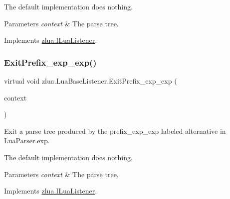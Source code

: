 The default implementation does nothing.


\begin{DoxyParams}{Parameters}
{\em context} & The parse tree.\\
\hline
\end{DoxyParams}


Implements \mbox{\hyperlink{interfacezlua_1_1_i_lua_listener_a067b1e085ec7ffaab84c99f820ccd5fa}{zlua.\+I\+Lua\+Listener}}.

\mbox{\label{classzlua_1_1_lua_base_listener_a7127f827c3355d3bac100faa365ffa5b}} 
\subsubsection{\texorpdfstring{Exit\+Prefix\+\_\+exp\+\_\+exp()}{ExitPrefix\_exp\_exp()}}
{\footnotesize\ttfamily virtual void zlua.\+Lua\+Base\+Listener.\+Exit\+Prefix\+\_\+exp\+\_\+exp (\begin{DoxyParamCaption}\item[{\mbox{[}\+Not\+Null\mbox{]} \mbox{\hyperlink{classzlua_1_1_lua_parser_1_1_prefix__exp__exp_context}{Lua\+Parser.\+Prefix\+\_\+exp\+\_\+exp\+Context}}}]{context }\end{DoxyParamCaption})\hspace{0.3cm}{\ttfamily [virtual]}}



Exit a parse tree produced by the {\ttfamily prefix\+\_\+exp\+\_\+exp} labeled alternative in Lua\+Parser.\+exp. 

The default implementation does nothing.


\begin{DoxyParams}{Parameters}
{\em context} & The parse tree.\\
\hline
\end{DoxyParams}


Implements \mbox{\hyperlink{interfacezlua_1_1_i_lua_listener_a88094687ca2271e4cbef04c18a738b99}{zlua.\+I\+Lua\+Listener}}.

\mbox{\label{classzlua_1_1_lua_base_listener_a2d2173a2484aac9cb7e09010ca3170e9}} 
